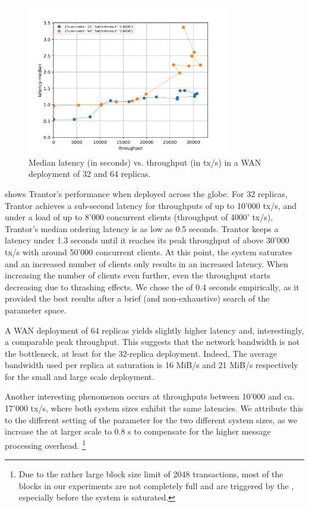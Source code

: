 \documentclass{article}
\begin{document}
\begin{figure}
    \centering
    \includegraphics[width=0.79\textwidth]{figures/results-wan-final.png}
    \caption{\centering Median latency (in seconds) vs. throughput (in tx/s)\newline
    in a WAN deployment of 32 and 64 replicas.}
    \label{fig:eval-wan}
\end{figure}

 shows Trantor's performance when deployed across the globe.
For 32 replicas, Trantor achieves a sub-second latency for throughputs of up to 10'000 tx/s,
and under a load of up to 8'000 concurrent clients (throughput of 4000' tx/s), Trantor's median ordering latency is as low as 0.5 seconds.
Trantor keeps a latency under 1.3 seconds until it reaches its peak throughput of above 30'000 tx/s with around 50'000 concurrent clients.
At this point, the system saturates and an increased number of clients only results in an increased latency.
When increasing the number of clients even further, even the throughput starts decreasing due to thrashing effects.
We chose the  of 0.4 seconds empirically,
as it provided the best results after a brief (and non-exhaustive) search of the parameter space.

A WAN deployment of 64 replicas yields slightly higher latency and, interestingly, a comparable peak throughput.
This suggests that the network bandwidth is not the bottleneck, at least for the 32-replica deployment.
Indeed, The average bandwidth used per replica at saturation is 16 MiB/s and 21 MiB/s respectively for the small and large scale deployment.

Another interesting phenomenon occurs at throughputs between 10'000 and ca. 17'000 tx/s, where both system sizes exhibit the same latencies.
We attribute this to the different setting of the  parameter for the two different system sizes,
as we increase the  at larger scale to 0.8 s to compensate for the higher message processing overhead.%
\footnote{Due to the rather large block size limit of 2048 transactions,
most of the blocks in our experiments are not completely full and are triggered by the , especially before the system is saturated.}
\end{document}
